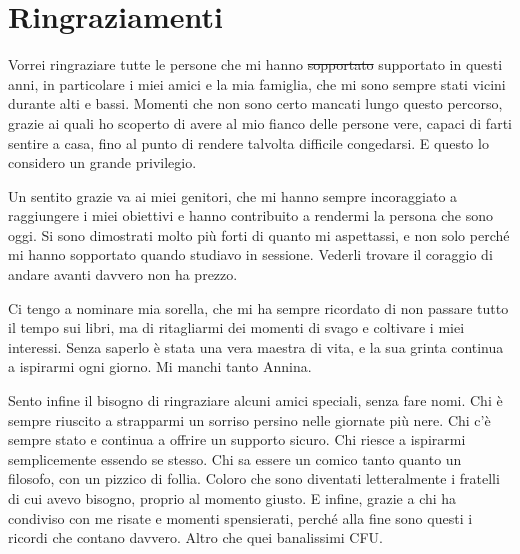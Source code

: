 \rhead[\fancyplain{}{\bfseries \leftmark}]{\fancyplain{}{\bfseries
\thepage}}

\clearpage{\pagestyle{empty}\cleardoublepage}
\chapter*{Ringraziamenti}
\thispagestyle{empty}



Vorrei ringraziare tutte le persone che mi hanno \sout{sopportato} supportato in questi anni, in particolare i miei amici e la mia famiglia, che mi sono sempre stati vicini durante alti e bassi. Momenti che non sono certo mancati lungo questo percorso, grazie ai quali ho scoperto di avere al mio fianco delle persone vere, capaci di farti sentire a casa, fino al punto di rendere talvolta difficile congedarsi. E questo lo considero un grande privilegio.

Un sentito grazie va ai miei genitori, che mi hanno sempre incoraggiato a raggiungere i miei obiettivi e hanno contribuito a rendermi la persona che sono oggi. Si sono dimostrati molto più forti di quanto mi aspettassi, e non solo perché mi hanno sopportato quando studiavo in sessione. Vederli trovare il coraggio di andare avanti davvero non ha prezzo.

Ci tengo a nominare mia sorella, che mi ha sempre ricordato di non passare tutto il tempo sui libri, ma di ritagliarmi dei momenti di svago e coltivare i miei interessi. Senza saperlo è stata una vera maestra di vita, e la sua grinta continua a ispirarmi ogni giorno. Mi manchi tanto Annina.

Sento infine il bisogno di ringraziare alcuni amici speciali, senza fare nomi. Chi è sempre riuscito a strapparmi un sorriso persino nelle giornate più nere. Chi c'è sempre stato e continua a offrire un supporto sicuro. Chi riesce a ispirarmi semplicemente essendo se stesso. Chi sa essere un comico tanto quanto un filosofo, con un pizzico di follia. Coloro che sono diventati letteralmente i fratelli di cui avevo bisogno, proprio al momento giusto. E infine, grazie a chi ha condiviso con me risate e momenti spensierati, perché alla fine sono questi i ricordi che contano davvero. Altro che quei banalissimi CFU.

